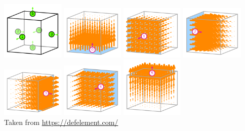 \begin{center}
\includegraphics[width=3cm]{images/pair_raviart-thomas/element-NCF-variant-equispaced-hexahedron-1-dofs}
\includegraphics[width=3cm]{images/pair_raviart-thomas/element-NCF-variant-equispaced-hexahedron-1-0}
\includegraphics[width=3cm]{images/pair_raviart-thomas/element-NCF-variant-equispaced-hexahedron-1-1}
\includegraphics[width=3cm]{images/pair_raviart-thomas/element-NCF-variant-equispaced-hexahedron-1-2}\\
\includegraphics[width=3cm]{images/pair_raviart-thomas/element-NCF-variant-equispaced-hexahedron-1-3}
\includegraphics[width=3cm]{images/pair_raviart-thomas/element-NCF-variant-equispaced-hexahedron-1-4}
\includegraphics[width=3cm]{images/pair_raviart-thomas/element-NCF-variant-equispaced-hexahedron-1-5}\\
{\captionfont Taken from \url{https://defelement.com/}}
\end{center}


